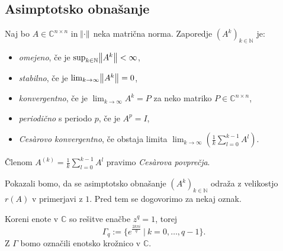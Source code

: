\documentclass[mat1]{fmfdelo}
\newcommand{\N}{\mathbb N}
\newcommand{\C}{\mathbb C}
\begin{document}
\subsection{Asimptotsko obnašanje}
\begin{definicija}\label{definicijaAsimptotika}
    Naj bo $A \in \C^{n\times n}$ in $\norm{\cdot}$ neka matrična norma. Zaporedje $(A^k)_{k\in\N}$ je:
    \begin{itemize}
        \item \emph{omejeno}, če je $\sup_{k\in \N} \norm{A^k} < \infty$,
        \item \emph{stabilno}, če je $\lim_{k \rightarrow \infty} \norm{A^k} = 0$,
        \item \emph{konvergentno}, če je $\lim_{k \rightarrow \infty} A^k = P$ za neko matriko $P \in \C^{n \times n}$,
        \item \emph{periodično} s periodo $p$, če je $A^p = I$,
        \item \emph{Ces\`arovo konvergentno}, če obstaja limita $\lim_{k \rightarrow \infty} \left(\frac{1}{k}\sum_{l=0}^{k-1} A^l\right)$.
    \end{itemize}
    Členom $A^{(k)} = \frac{1}{k}\sum_{l=0}^{k-1} A^l$ pravimo \emph{Ces\`arova povprečja}.
\end{definicija}
Pokazali bomo, da se asimptotsko obnašanje $(A^k)_{k\in\N}$ odraža z velikostjo $r(A)$ v primerjavi z $1$. Pred tem se dogovorimo za nekaj oznak.

Koreni enote v $\C$ so rešitve enačbe $z^q = 1$, torej
\begin{equation*}
    \Gamma_q := \{e^{\frac{2 k \pi i}{q}}\ |\ k = 0, \ldots, q - 1\}.
\end{equation*}
Z $\Gamma$ bomo označili enotsko krožnico v $\C$.
\end{document}
